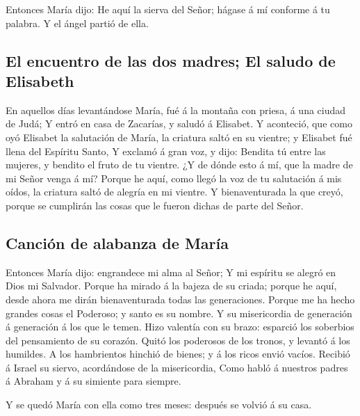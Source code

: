  Entonces María dijo: He aquí la sierva del Señor; hágase
á mí conforme á tu palabra. Y el ángel partió de ella.

\hypertarget{el-encuentro-de-las-dos-madres-el-saludo-de-elisabeth}{%
\subsection{El encuentro de las dos madres; El saludo de
Elisabeth}\label{el-encuentro-de-las-dos-madres-el-saludo-de-elisabeth}}

 En aquellos días levantándose María, fué á la montaña
con priesa, á una ciudad de Judá;  Y entró en casa de
Zacarías, y saludó á Elisabet.  Y aconteció, que como oyó
Elisabet la salutación de María, la criatura saltó en su vientre; y
Elisabet fué llena del Espíritu Santo,  Y exclamó á gran
voz, y dijo: Bendita tú entre las mujeres, y bendito el fruto de tu
vientre.  ¿Y de dónde esto á mí, que la madre de mi Señor
venga á mí?  Porque he aquí, como llegó la voz de tu
salutación á mis oídos, la criatura saltó de alegría en mi vientre.
 Y bienaventurada la que creyó, porque se cumplirán las
cosas que le fueron dichas de parte del Señor.

\hypertarget{canciuxf3n-de-alabanza-de-maruxeda}{%
\subsection{Canción de alabanza de
María}\label{canciuxf3n-de-alabanza-de-maruxeda}}

 Entonces María dijo: engrandece mi alma al Señor;
 Y mi espíritu se alegró en Dios mi Salvador.
 Porque ha mirado á la bajeza de su criada; porque he
aquí, desde ahora me dirán bienaventurada todas las generaciones.
 Porque me ha hecho grandes cosas el Poderoso; y santo es
su nombre.  Y su misericordia de generación á generación
á los que le temen.  Hizo valentía con su brazo: esparció
los soberbios del pensamiento de su corazón.  Quitó los
poderosos de los tronos, y levantó á los humildes.  A los
hambrientos hinchió de bienes; y á los ricos envió vacíos.
 Recibió á Israel su siervo, acordándose de la
misericordia,  Como habló á nuestros padres á Abraham y á
su simiente para siempre.

 Y se quedó María con ella como tres meses: después se
volvió á su casa.

